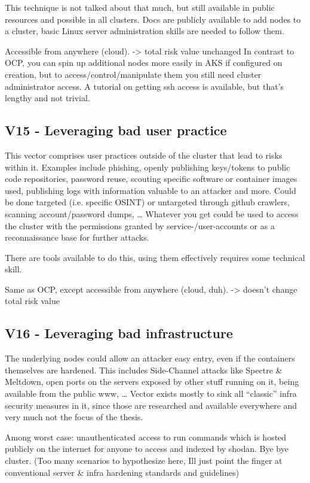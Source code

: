 This technique is not talked about that much, but still available in public resources and possible in all clusters. Docs are publicly available to add nodes to a cluster, basic Linux server administration skills are needed to follow them.

Accessible from anywhere (cloud).
-> total risk value unchanged
In contrast to OCP, you can spin up additional nodes more easily in AKS if configured on creation, but to access/control/manipulate them you still need cluster administrator access.
A tutorial on getting ssh access is available, but that's lengthy and not trivial.

\subsection{V15 - Leveraging bad user practice}
This vector comprises user practices outside of the cluster that lead to risks within it. Examples include phishing, openly publishing keys/tokens to public code repositories, password reuse, scouting specific software or container images used, publishing logs with information valuable to an attacker and more.
Could be done targeted (i.e. specific OSINT) or untargeted through github crawlers, scanning account/password dumps, …
Whatever you get could be used to access the cluster with the permissions granted by service-/user-accounts or as a reconnaissance base for further attacks.

There are tools available to do this, using them effectively requires some technical skill.

Same as OCP, except accessible from anywhere (cloud, duh).
-> doesn't change total risk value

\subsection{V16 - Leveraging bad infrastructure}
The underlying nodes could allow an attacker easy entry, even if the containers themselves are hardened. This includes Side-Channel attacks like Spectre \& Meltdown, open ports on the servers exposed by other stuff running on it, being available from the public www, …
Vector exists mostly to sink all “classic” infra security measures in it, since those are researched and available everywhere and very much not the focus of the thesis.

Among worst case: unauthenticated access to run commands which is hosted publicly on the internet for anyone to access and indexed by shodan. Bye bye cluster.
(Too many scenarios to hypothesize here, Ill just point the finger at conventional server \& infra hardening standards and guidelines)

